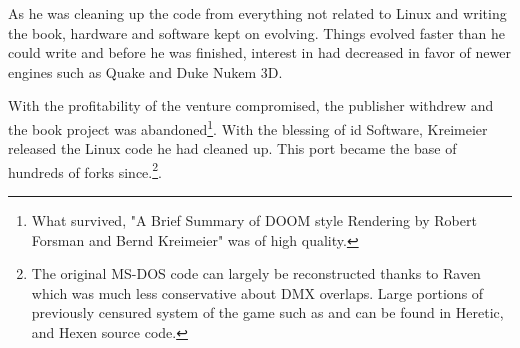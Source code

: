 \par
 As he was cleaning up the code from everything not related to Linux and writing the book, hardware and software kept on evolving. Things evolved faster than he could write and before he was finished, interest in \doom{} had decreased in favor of newer engines such as Quake and Duke Nukem 3D.\\
 \par
  With the profitability of the venture compromised, the publisher withdrew and the book project was abandoned\footnote{What survived, "A Brief Summary of DOOM style Rendering by Robert Forsman and Bernd Kreimeier" was of high quality.}. With the blessing of id Software, Kreimeier released the Linux code he had cleaned up. This port became the base of hundreds of forks since.\footnote{The original MS-DOS code can largely be reconstructed thanks to Raven which was much less conservative about DMX overlaps. Large portions of previously censured system of the game such as  and  can be found in Heretic, and Hexen source code.}.\\
 \par  


